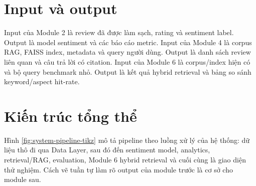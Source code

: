 \section{Input và output}
Input của Module 2 là review đã được làm sạch, rating và sentiment label. Output là model sentiment và các báo cáo metric. Input của Module 4 là corpus RAG, FAISS index, metadata và query người dùng. Output là danh sách review liên quan và câu trả lời có citation. Input của Module 6 là corpus/index hiện có và bộ query benchmark nhỏ. Output là kết quả hybrid retrieval và bảng so sánh keyword/aspect hit-rate.

\section{Kiến trúc tổng thể}
Hình \ref{fig:system-pipeline-tikz} mô tả pipeline theo luồng xử lý của hệ thống: dữ liệu thô đi qua Data Layer, sau đó đến sentiment model, analytics, retrieval/RAG, evaluation, Module 6 hybrid retrieval và cuối cùng là giao diện thử nghiệm. Cách vẽ tuần tự làm rõ output của module trước là cơ sở cho module sau.

